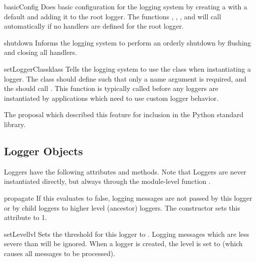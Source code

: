 \begin{funcdesc}{basicConfig}{}
Does basic configuration for the logging system by creating a
 with a default  and adding it to
the root logger. The functions , ,
,  and  will call
 automatically if no handlers are defined for the
root logger.
\end{funcdesc}

\begin{funcdesc}{shutdown}{}
Informs the logging system to perform an orderly shutdown by flushing and
closing all handlers.
\end{funcdesc}

\begin{funcdesc}{setLoggerClass}{klass}
Tells the logging system to use the class  when instantiating a
logger. The class should define  such that only a name
argument is required, and the  should call
. This function is typically called before any
loggers are instantiated by applications which need to use custom logger
behavior.
\end{funcdesc}


\begin{seealso}
         {The proposal which described this feature for inclusion in
          the Python standard library.}
\end{seealso}


\subsection{Logger Objects}

Loggers have the following attributes and methods. Note that Loggers are
never instantiated directly, but always through the module-level function
.

\begin{datadesc}{propagate}
If this evaluates to false, logging messages are not passed by this
logger or by child loggers to higher level (ancestor) loggers. The
constructor sets this attribute to 1.
\end{datadesc}

\begin{methoddesc}{setLevel}{lvl}
Sets the threshold for this logger to . Logging messages
which are less severe than  will be ignored. When a logger is
created, the level is set to  (which causes all messages
to be processed).
\end{methoddesc}

